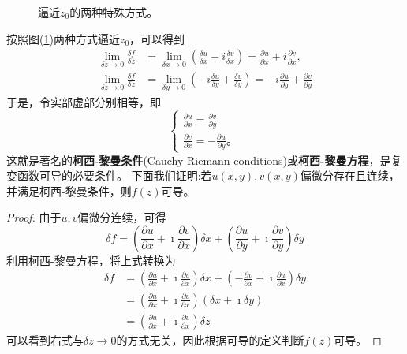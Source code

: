 \begin{figure}
    \centering
    
    \caption{逼近$z_0$的两种特殊方式。}
    \label{fig:limits}
\end{figure}
按照图(\ref{fig:limits})两种方式逼近$z_0$，可以得到
\begin{align}
    \lim _{\delta z \rightarrow 0} \frac{\delta f}{\delta z} &=\lim _{\delta x \rightarrow 0}\left(\frac{\delta u}{\delta x}+i \frac{\delta v}{\delta x}\right)=\frac{\partial u}{\partial x}+i \frac{\partial v}{\partial x},
\\
    \lim _{\delta z \rightarrow 0} \frac{\delta f}{\delta z} &=\lim _{\delta y \rightarrow 0}\left(-i \frac{\delta u}{\delta y}+\frac{\delta v}{\delta y}\right)=-i \frac{\partial u}{\partial y}+\frac{\partial v}{\partial y}
\end{align}
于是，令实部虚部分别相等，即
\begin{equation}
    \begin{cases}
        \frac{\partial u}{\partial x}=\frac{\partial v}{\partial y} \\
        \frac{\partial v}{\partial x}=-\frac{\partial u}{\partial y} \textrm{。}
    \end{cases}
\end{equation}
这就是著名的{\bf 柯西-黎曼条件}(Cauchy-Riemann conditions)或{\bf 柯西-黎曼方程}，是复变函数可导的必要条件。
下面我们证明:若$u(x,y), v(x,y)$偏微分存在且连续，并满足柯西-黎曼条件，则$f(z)$可导。
\begin{proof}
    由于$u,v$偏微分连续，可得
    \begin{equation*}
        \delta f=\left(\frac{\partial u}{\partial x}+\imath \frac{\partial v}{\partial x}\right) \delta x+\left(\frac{\partial u}{\partial y}+ \imath \frac{\partial v}{\partial y}\right) \delta y
    \end{equation*}
    利用柯西-黎曼方程，将上式转换为
    \begin{equation*}
        \begin{aligned}
        \delta f & =\left(\frac{\partial u}{\partial x}+ \imath \frac{\partial v}{\partial x}\right) \delta x+\left(-\frac{\partial v}{\partial x}+ \imath\frac{\partial u}{\partial x}\right) \delta y \\
        & =\left(\frac{\partial u}{\partial x}+ \imath \frac{\partial v}{\partial x}\right)(\delta x+ \imath \delta y) 
        \\
        & = \left(\frac{\partial u}{\partial x}+ \imath \frac{\partial v}{\partial x}\right) \delta z
        \end{aligned}
    \end{equation*}
可以看到右式与$\delta z\to 0$的方式无关，因此根据可导的定义判断$f(z)$可导。
\end{proof}
